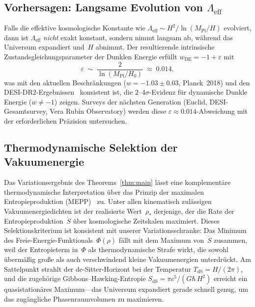 \documentclass[12pt,a4paper]{article}
\theoremstyle{definition}
\theoremstyle{plain}
\theoremstyle{remark}
\newcommand{\Leff}{\Lambda_{\mathrm{eff}}}
\begin{document}
\subsection{Vorhersagen: Langsame Evolution von $\Leff$}

Falls die effektive kosmologische Konstante wie
$\Leff \sim H^{2}/\ln(M_{\mathrm{Pl}}/H)$ evolviert, dann ist $\Leff$
\emph{nicht} exakt konstant, sondern nimmt langsam ab, w\"ahrend das
Universum expandiert und~$H$ abnimmt. Der resultierende intrinsische
Zustandsgleichungsparameter der Dunklen Energie erf\"ullt
$w_{\mathrm{DE}} = -1 + \varepsilon$ mit
\begin{equation}
  \varepsilon \;\sim\;
  \frac{2}{\ln(M_{\mathrm{Pl}}/H_0)}
  \;\approx\; 0.014,
\end{equation}
was mit den aktuellen Beschr\"ankungen
($w = -1.03 \pm 0.03$, Planck~2018) und den
DESI-DR2-Ergebnissen~\cite{DESI2025} konsistent ist, die
$2$--$4\sigma$-Evidenz f\"ur dynamische Dunkle Energie ($w \neq -1$)
zeigen. Surveys der n\"achsten Generation (Euclid,
DESI-Gesamtsurvey, Vera Rubin Observatory) werden diese
$\varepsilon \approx 0.014$-Abweichung mit der erforderlichen
Pr\"azision untersuchen.

\subsection{Thermodynamische Selektion der Vakuumenergie}\label{sec:selection}

Das Variationsergebnis des Theorems~\ref{thm:main} l\"asst eine komplement\"are thermodynamische Interpretation \"uber das Prinzip der maximalen Entropieproduktion (MEPP)~\cite{MartyushevSeleznev2006} zu. Unter allen kinematisch zul\"assigen Vakuumenergiedichten ist der realisierte Wert~$\rho_\ast$ derjenige, der die Rate der Entropieproduktion~$\dot{S}$ \"uber kosmologische Zeitskalen maximiert. Dieses Selektionskriterium ist konsistent mit unserer Variationsschranke: Das Minimum des Freie-Energie-Funktionals~$\Phi(\rho)$ f\"allt mit dem Maximum von~$\dot{S}$ zusammen, weil der Entropieterm in~$\Phi$ als thermodynamische Strafe wirkt, die sowohl \"uberm\"a\ss ig gro\ss e als auch verschwindend kleine Vakuumenergien unterdr\"uckt. Am Sattelpunkt strahlt der de-Sitter-Horizont bei der Temperatur $T_{\mathrm{dS}} = H/(2\pi)$, und die zugeh\"orige Gibbons--Hawking-Entropie $S_{\mathrm{dS}} = \pi c^5/(G\hbar\,H^2)$ erreicht ein quasistation\"ares Maximum---das Universum expandiert gerade schnell genug, um das zug\"angliche Phasenraumvolumen zu maximieren.
\end{document}
